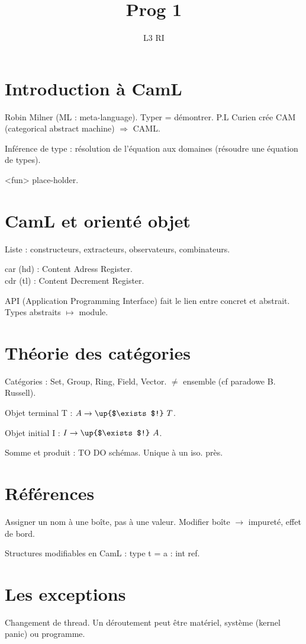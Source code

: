 \documentclass[french]{article}
\title{Prog 1}
\date{}
\author{L3 RI}
\begin{document}
\maketitle
\tableofcontents
\newpage

\section{Introduction à CamL}
Robin Milner (ML : meta-language).
Typer = démontrer.
P.L Curien crée CAM (categorical abstract machine)
$\Rightarrow$ CAML.

Inférence de type : résolution de l'équation aux domaines (résoudre une équation de types).

<fun> place-holder.

\section{CamL et orienté objet}
Liste : constructeurs, extracteurs, observateurs, combinateurs.

car (hd) : Content Adress Register.\\
cdr (tl) : Content Decrement Register.

API (Application Programming Interface) fait le lien entre concret et abstrait. Types abstraits $\mapsto$ module.

\section{Théorie des catégories}
Catégories : Set, Group, Ring, Field, Vector. $\neq$ ensemble (cf paradowe B. Russell).

Objet terminal T : $A \rightarrow\up{$\exists$!}\ T$.

Objet initial I : $I \rightarrow\up{$\exists$!}\ A$.

Somme et produit : TO DO schémas. Unique à un iso. près.

\section{Références}
Assigner un nom à une boîte, pas à une valeur. Modifier boîte $\rightarrow$ impureté, effet de bord.

Structures modifiables en CamL : type t = {a : int ref}.

\section{Les exceptions}
Changement de thread. Un déroutement peut être matériel, système (kernel panic) ou programme.
\end{document}
